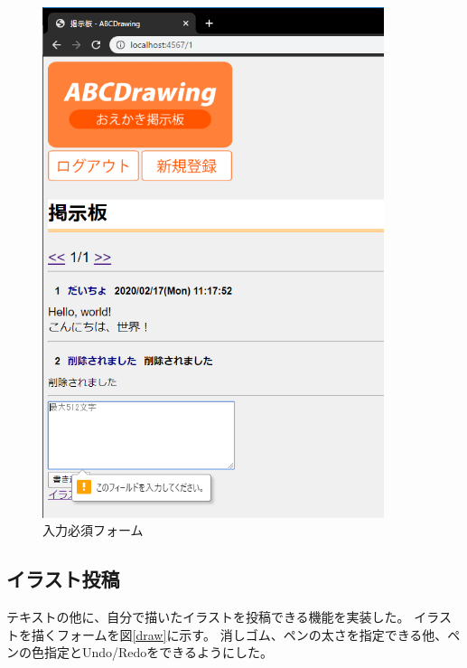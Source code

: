 \documentclass[a4j,titlepage]{jsarticle}
\begin{document}
\begin{figure}[H]
  \centering
  \includegraphics[width=10cm]{bbs06.png}
  \caption{入力必須フォーム}
  \label{f4}
\end{figure}

\subsection{イラスト投稿}
テキストの他に、自分で描いたイラストを投稿できる機能を実装した。
イラストを描くフォームを図\ref{draw}に示す。
消しゴム、ペンの太さを指定できる他、ペンの色指定とUndo/Redoをできるようにした。
\end{document}

